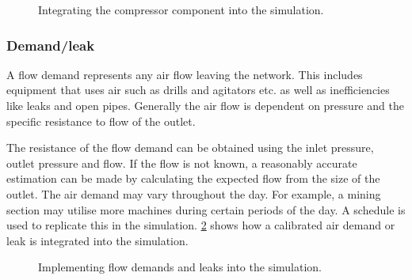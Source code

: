 		\begin{figure}[h]
			\centering
			\caption{Integrating the compressor component into the simulation.}
			\label{fig: Compressor models}
		\end{figure}		

		\subsubsection{Demand/leak}
			A flow demand represents any air flow leaving the network. This includes equipment that uses air such as drills and agitators etc. as well as inefficiencies like leaks and open pipes. Generally the air flow is dependent on pressure and the specific resistance to flow of the outlet. 
			\par 
			The resistance of the flow demand can be obtained using the inlet pressure, outlet pressure and flow. If the flow is not known, a reasonably accurate estimation can be made by calculating the expected flow from the size of the outlet. The air demand may vary throughout the day. For example, a mining section may utilise more machines during certain periods of the day. A schedule is used to replicate this in the simulation. \cref{fig: Demand component} shows how a calibrated air demand or leak is integrated into the simulation.
			\begin{figure}[h]
				\centering
				\caption{Implementing flow demands and leaks into the simulation.} 
				\label{fig: Demand component}
			\end{figure}
